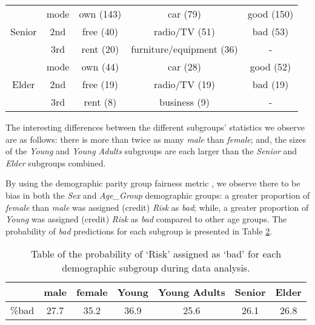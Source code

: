 \documentclass[conference]{IEEEtran}
\begin{document}
\begin{table}[ht]
\begin{center}
\begin{tabular}{|c|c|c|c|c|}
        \hline 
        \multirow{3}{*}{Senior} 
        & mode              & own (143) & car (79)& good (150)\\
        & 2nd & free (40) & radio/TV (51) & bad (53) \\
        & 3rd & rent (20) & furniture/equipment (36) & -\\ 
        \hline
        \multirow{3}{*}{Elder} 
        & mode              & own (44)  & car (28) & good (52) \\ 
        & 2nd & free (19) & radio/TV (19)& bad (19)\\
        & 3rd & rent (8)  & business (9) & - \\ 
        \hline
    \end{tabular}
    \label{table:3}
    \end{center}
\end{table}

The interesting differences between the different subgroups' statistics we observe are as follows: there is more than twice as many \emph{male} than \emph{female}; and, the sizes of the \emph{Young} and \emph{Young Adults} subgroups are each larger than the \emph{Senior} and \emph{Elder} subgroups combined.


By using the demographic parity group fairness metric \cite{DBLP:journals/corr/abs-1710-03184}, we observe there to be bias in both the \emph{Sex} and \emph{Age\_Group} demographic groups: a greater proportion of \emph{female} than \emph{male} was assigned (credit) \emph{Risk} as \emph{bad}; while, a greater proportion of \emph{Young} was assigned (credit) \emph{Risk} as \emph{bad} compared to other age groups. The probability of \emph{bad} predictions for each subgroup is presented in Table \ref{table:4}. 

\begin{table}[ht]
    \begin{center}
    \caption{Table of the probability of `Risk' assigned as `bad' for each demographic subgroup during data analysis.}
    \begin{tabular}{ |c|c|c|c|c|c|c| } 
        \hline
                & male & female & Young & Young Adults & Senior & Elder \\ 
            \hline
            \%bad & 27.7 & 35.2 & 36.9 & 25.6 & 26.1 & 26.8 \\
            \hline
    \end{tabular}
    \label{table:4}
    \end{center}
\end{table}
\end{document}

